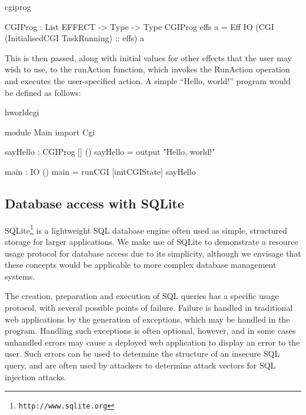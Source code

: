 \begin{SaveVerbatim}{cgiprog}

CGIProg : List EFFECT -> Type -> Type
CGIProg effs a = 
  Eff IO (CGI (InitialisedCGI TaskRunning) :: effs) a

\end{SaveVerbatim}

\noindent
This is then passed, along with initial values for other effects that the user
may wish to use, to the runAction function, which invokes the RunAction
operation and executes the user-specified action.
%
A simple ``Hello, world!'' program would be defined as follows:

\begin{SaveVerbatim}{hworldcgi}

module Main
import Cgi

sayHello : CGIProg [] ()
sayHello = output "Hello, world!"

main : IO ()
main = runCGI [initCGIState] sayHello

\end{SaveVerbatim}

\subsection{Database access with SQLite}

SQLite\footnote{\texttt{http://www.sqlite.org}} is a lightweight SQL database
engine often used as simple, structured storage for larger applications. We
make use of SQLite to demonstrate a resource usage protocol for database access due to its simplicity, although we envisage that these
concepts would be applicable to more complex database management systems. 

The creation, preparation and execution of SQL queries has a specific usage
protocol, with several possible points of failure. Failure is handled in
traditional web applications by the generation of exceptions, which may be
handled in the program.  Handling such exceptions is often optional, however,
and in some cases unhandled errors may cause a deployed web application to
display an error to the user. Such errors can be used to determine the
structure of an insecure SQL query, and are often used by attackers to
determine attack vectors for SQL injection attacks.

